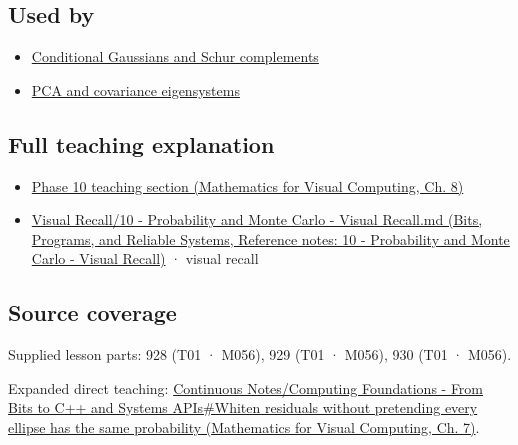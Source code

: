\subsection{Used by}\label{appendix-12bbe185dbe5-used-by}

\begin{itemize}
\tightlist
\item
  \hyperref[appendix-f0437ea55a47]{Conditional Gaussians and Schur complements}
\item
  \hyperref[appendix-ad175ef3c5bf]{PCA and covariance eigensystems}
\end{itemize}

\subsection{Full teaching explanation}\label{appendix-12bbe185dbe5-full-teaching-explanation}

\begin{itemize}
\tightlist
\item
  \href{../02-Mathematics-for-Visual-Computing/main.pdf\#nameddest=02-foundations-ii-ch024-waiting-times-event-counts-and-covariance-geometry}{Phase 10 teaching section (Mathematics for Visual Computing, Ch. 8)}
\item
  \href{../01-Bits-Programs-and-Reliable-Systems/main.pdf\#nameddest=appendix-cb5af353ef77}{Visual Recall/10 - Probability and Monte Carlo - Visual Recall.md (Bits, Programs, and Reliable Systems, Reference notes: 10 - Probability and Monte Carlo - Visual Recall)} · visual recall
\end{itemize}

\subsection{Source coverage}\label{appendix-12bbe185dbe5-source-coverage}

Supplied lesson parts: 928 (T01 · M056), 929 (T01 · M056), 930 (T01 · M056).

Expanded direct teaching: \href{../02-Mathematics-for-Visual-Computing/main.pdf\#nameddest=02-foundations-ii-ch023-whiten-residuals-without-pretending-every-ellipse-has-the-same-probability}{Continuous Notes/Computing Foundations - From Bits to C++ and Systems APIs\#Whiten residuals without pretending every ellipse has the same probability (Mathematics for Visual Computing, Ch. 7)}.
